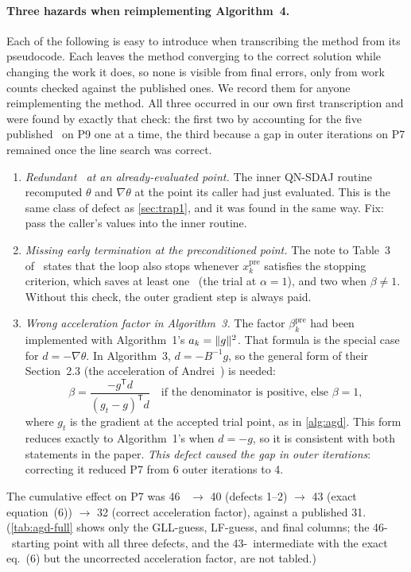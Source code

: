 \paragraph{Three hazards when reimplementing Algorithm~4.}
Each of the following is easy to introduce when transcribing the method from
its pseudocode. Each leaves the method converging to the correct solution
while changing the work it does, so none is visible from final errors, only
from work counts checked against the published ones. We record them for anyone
reimplementing the method. All three occurred in our own first transcription
and were found by exactly that check: the first two by accounting for the five
published \EVDs\ on P9 one at a time, the third because a gap in outer
iterations on P7 remained once the line search was correct.
\begin{enumerate}
  \item \emph{Redundant \EVD\ at an already-evaluated point.} The inner
    QN-SDAJ routine recomputed $\theta$ and $\nabla\theta$ at the point its
    caller had just evaluated. This is the same class of defect as
    \cref{sec:trap1}, and it was found in the same way. Fix: pass the
    caller's values into the inner routine.
  \item \emph{Missing early termination at the preconditioned point.} The
    note to Table~3 of~\cite{huynh2025accelerated} states that the loop also stops
    whenever $x_k^{\mathrm{pre}}$ satisfies the stopping criterion, which
    saves at least one \EVD\ (the trial at $\alpha=1$), and two when
    $\beta\ne1$. Without this check, the outer gradient step is always
    paid.
  \item \emph{Wrong acceleration factor in Algorithm~3.} The factor
    $\beta_k^{\mathrm{pre}}$ had been implemented with Algorithm~1's
    $a_k=\lVert g\rVert^2$. That formula is the special case for $d=-\nabla\theta$.
    In Algorithm~3, $d=-B^{-1}g$, so the general form of their Section~2.3
    (the acceleration of Andrei~\cite{andrei2006acceleration}) is needed:
    \[
      \beta=\frac{-g^{\mathsf T}d}{(g_t-g)^{\mathsf T}d}\quad\text{if the denominator is positive, else }\beta=1,
    \]
    where $g_t$ is the gradient at the accepted trial point, as in
    \cref{alg:agd}.
    This form reduces exactly to Algorithm~1's when $d=-g$, so it is
    consistent with both statements in the paper. \emph{This defect caused
    the gap in outer iterations}: correcting it reduced P7 from 6 outer
    iterations to 4.
\end{enumerate}
The cumulative effect on P7 was 46 \EVDs\ $\to$ 40 (defects 1--2) $\to$ 43
(exact equation~(6)) $\to$ 32 (correct acceleration factor), against a
published 31. (\cref{tab:agd-full} shows only the GLL-guess, LF-guess, and
final columns; the 46-\EVD\ starting point with all three defects, and the
43-\EVD\ intermediate with the exact eq.~(6) but the uncorrected acceleration
factor, are not tabled.)

